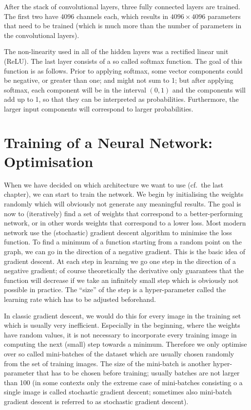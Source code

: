 After the stack of convolutional layers, three fully connected layers are
trained. The first two have 4096 channels each, which results in
$4096 \times 4096$ parameters that need to be trained (which is much more than
the number of parameters in the convolutional layers).

The non-linearity used in all of the hidden layers was a rectified linear unit
(ReLU). The last layer consists of a so called softmax function. The goal of
this function is as follows. Prior to applying softmax, some vector components
could be negative, or greater than one; and might not sum to 1; but after
applying softmax, each component will be in the interval $(0,1)$ and the
components will add up to 1, so that they can be interpreted as
probabilities. Furthermore, the larger input components will correspond to
larger probabilities.

\section{Training of a Neural Network: Optimisation}%
\label{sec:train_cnn}
When we have decided on which architecture we want to use (cf.~the last
chapter), we can start to train the network. We begin by initialising the
weights randomly which will obviously not generate any meaningful results.  The
goal is now to (iteratively) find a set of weights that correspond to a
better-performing network, or in other words weights that correspond to a lower
loss. Most modern network use the (stochastic) gradient descent algorithm to
minimise the loss function. To find a minimum of a function starting from a
random point on the graph, we can go in the direction of a negative gradient.
This is the basic idea of gradient descent. At each step in learning we go one
step in the direction of a negative gradient; of course theoretically the
derivative only guarantees that the function will decrease if we take an
infinitely small step which is obviously not possible in practice. The ``size''
of the step is a hyper-parameter called the learning rate which has to be
adjusted beforehand.

In classic gradient descent, we would do this for every image in the training
set which is usually very inefficient. Especially in the beginning, where the
weights have random values, it is not necessary to incorporate every training
image in computing the next (small) step towards a minimum. Therefore we only
optimise over so called mini-batches of the dataset which are usually chosen
randomly from the set of training images. The size of the mini-batch is another
hyper-parameter that has to be chosen before training; usually batches are not
larger than 100 (in some contexts only the extreme case of mini-batches
consisting o a single image is called stochastic gradient descent; sometimes
also mini-batch gradient descent is referred to as stochastic gradient descent).

